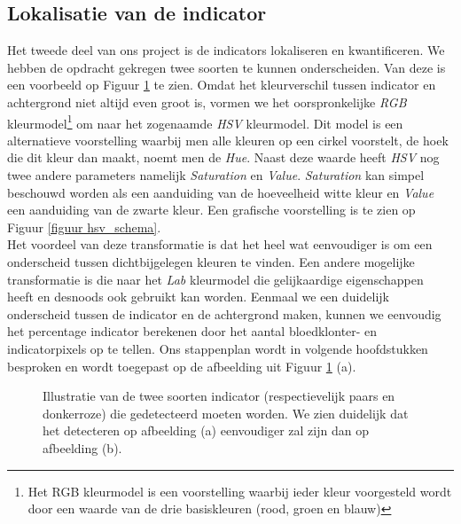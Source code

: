 \documentclass[a4paper,kulak]{kulakarticle}
\begin{document}
\subsection{Lokalisatie van de indicator}
Het tweede deel van ons project is de indicators lokaliseren en kwantificeren. We hebben de opdracht gekregen twee soorten te kunnen onderscheiden. Van deze is een voorbeeld op Figuur \ref{figuur indicators} te zien. Omdat het kleurverschil tussen indicator en achtergrond niet altijd even groot is, vormen we het oorspronkelijke \textit{RGB} kleurmodel\footnote{Het RGB kleurmodel is een voorstelling waarbij ieder kleur voorgesteld wordt door een waarde van de drie basiskleuren (rood, groen en blauw)} om naar het zogenaamde \textit{HSV} kleurmodel. Dit model is een alternatieve voorstelling waarbij men alle kleuren op een cirkel voorstelt, de hoek die dit kleur dan maakt, noemt men de \textit{Hue}. Naast deze waarde heeft \textit{HSV} nog twee andere parameters namelijk \textit{Saturation} en \textit{Value}. \textit{Saturation} kan simpel beschouwd worden als een aanduiding van de hoeveelheid witte kleur en \textit{Value} een aanduiding van de zwarte kleur. Een grafische voorstelling is te zien op Figuur \ref{figuur hsv_schema}.\\
Het voordeel van deze transformatie is dat het heel wat eenvoudiger is om een onderscheid tussen dichtbijgelegen kleuren te vinden. Een andere mogelijke transformatie is die naar het \textit{Lab} kleurmodel die gelijkaardige eigenschappen heeft en desnoods ook gebruikt kan worden. Eenmaal we een duidelijk onderscheid tussen de indicator en de achtergrond maken, kunnen we eenvoudig het percentage indicator berekenen door het aantal bloedklonter- en indicatorpixels op te tellen. Ons stappenplan wordt in volgende hoofdstukken besproken en wordt toegepast op de afbeelding uit Figuur \ref{figuur indicators} (a).

\begin{figure}[H]
	\centering
	\qquad
	
	\caption{Illustratie van de twee soorten indicator (respectievelijk paars en donkerroze) die gedetecteerd moeten worden. We zien duidelijk dat het detecteren op afbeelding (a) eenvoudiger zal zijn dan op afbeelding (b).}
	\label{figuur indicators}
\end{figure}
\end{document}
